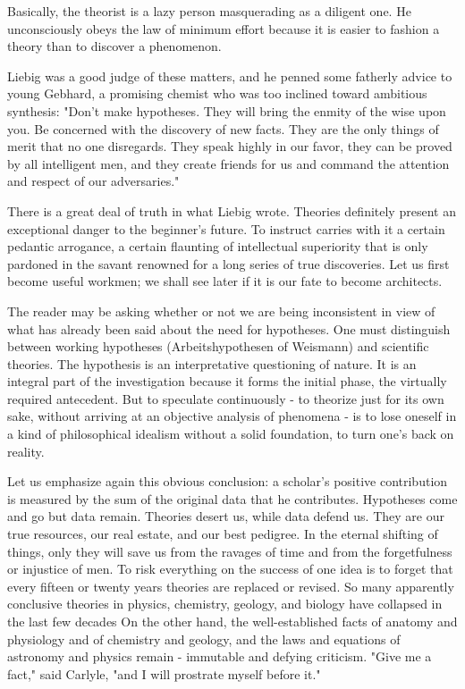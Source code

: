 \documentclass{article}
\begin{document}
Basically, the theorist is a lazy person masquerading as a diligent one. He unconsciously obeys the law of minimum effort because it is easier to fashion a theory than to discover a phenomenon.

Liebig was a good judge of these matters, and he penned some fatherly advice to young Gebhard, a promising chemist who was too inclined toward ambitious synthesis: "Don’t make hypotheses. They will bring the enmity of the wise upon you. Be concerned with the discovery of new facts. They are the only things of merit that no one disregards. They speak highly in our favor, they can be proved by all intelligent men, and they create friends for us and command the attention and respect of our adversaries."

There is a great deal of truth in what Liebig wrote. Theories definitely present an exceptional danger to the beginner’s future. To instruct carries with it a certain pedantic arrogance, a certain flaunting of intellectual superiority that is only pardoned in the savant renowned for a long series of true discoveries. Let us first become useful workmen; we shall see later if it is our fate to become architects.

The reader may be asking whether or not we are being inconsistent in view of what has already been said about the need for hypotheses. One must distinguish between working hypotheses (Arbeitshypothesen of Weismann) and scientific theories. The hypothesis is an interpretative questioning of nature. It is an integral part of the investigation because it forms the initial phase, the virtually required antecedent. But to speculate continuously - to theorize just for its own sake, without arriving at an objective analysis of phenomena - is to lose oneself in a kind of philosophical idealism without a solid foundation, to turn one’s back on reality.

Let us emphasize again this obvious conclusion: a scholar’s positive contribution is measured by the sum of the original data that he contributes. Hypotheses come and go but data remain. Theories desert us, while data defend us. They are our true resources, our real estate, and our best pedigree. In the eternal shifting of things, only they will save us from the ravages of time and from the forgetfulness or injustice of men. To risk everything on the success of one idea is to forget that every fifteen or twenty years theories are replaced or revised. So many apparently conclusive theories in physics, chemistry, geology, and biology have collapsed in the last few decades\! On the other hand, the well-established facts of anatomy and physiology and of chemistry and geology, and the laws and equations of astronomy and physics remain - immutable and defying criticism. "Give me a fact," said Carlyle, "and I will prostrate myself before it."
\end{document}
